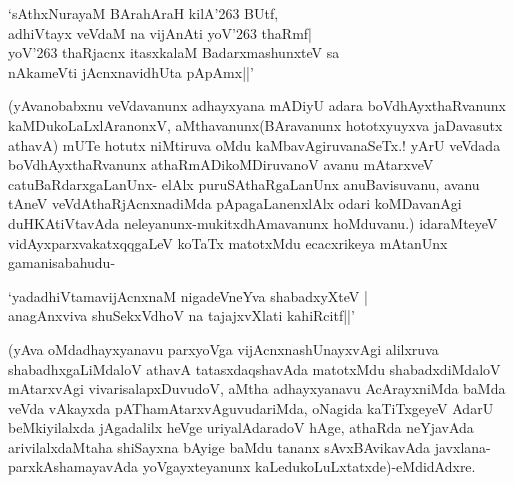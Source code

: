 \begin{shloka}
`sAthxNurayaM BArahAraH kilA\char'263 BUtf,\\
adhiVtayx veVdaM na vijAnAti yoV\char'263 thaRmf|\\
yoV\char'263 thaRjacnx itasxkalaM BadarxmashunxteV sa\\
nAkameVti jAcnxnavidhUta pApAmx||'
\end{shloka}

(yAvanobabxnu veVdavanunx adhayxyana mADiyU adara boVdhAyxthaRvanunx kaMDukoLaLxlAranonxV, aMthavanunx(BAravanunx hototxyuyxva jaDavasutx athavA) mUTe hotutx niMtiruva oMdu kaMbavAgiruvanaSeTx.! yArU veVdada boVdhAyxthaRvanunx athaRmADikoMDiruvanoV avanu mAtarxveV catuBaRdarxgaLanUnx- elAlx puruSAthaRgaLanUnx anuBavisuvanu, avanu tAneV veVdAthaRjAcnxnadiMda pApagaLanenxlAlx odari koMDavanAgi duHKAtiVtavAda neleyanunx-mukitxdhAmavanunx hoMduvanu.) idaraMteyeV vidAyxparxvakatxqqgaLeV koTaTx matotxMdu ecacxrikeya mAtanUnx gamanisabahudu-

\begin{shloka}
`yadadhiVtamavijAcnxnaM nigadeVneYva shabadxyXteV |\\
anagAnxviva shuSekxVdhoV na tajajxvXlati kahiRcitf||'
\end{shloka}

(yAva oMdadhayxyanavu parxyoVga vijAcnxnashUnayxvAgi alilxruva shabadhxgaLiMdaloV athavA tatasxdaqshavAda matotxMdu shabadxdiMdaloV mAtarxvAgi vivarisalapxDuvudoV, aMtha adhayxyanavu AcArayxniMda baMda veVda vAkayxda pAThamAtarxvAguvudariMda, oNagida kaTiTxgeyeV AdarU beMkiyilalxda jAgadalilx heVge uriyalAdaradoV hAge, athaRda neYjavAda arivilalxdaMtaha shiSayxna bAyige baMdu tananx sAvxBAvikavAda javxlana-parxkAshamayavAda yoVgayxteyanunx kaLedukoLuLxtatxde)-eMdidAdxre.

